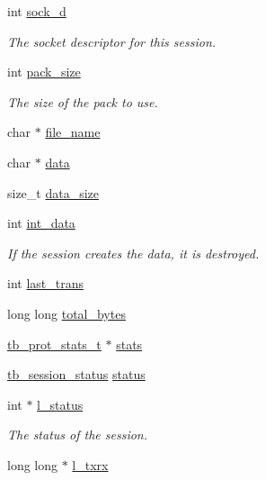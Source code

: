 \begin{DoxyCompactItemize}
int \hyperlink{structtb__session__t_a94d540b145f21be2f9b28a2c225ccf30}{sock\-\_\-d}
\begin{DoxyCompactList}\small\item\em The socket descriptor for this session. \end{DoxyCompactList}\item 
int \hyperlink{structtb__session__t_af7112fe07fe05134febc994e10196ce5}{pack\-\_\-size}
\begin{DoxyCompactList}\small\item\em The size of the pack to use. \end{DoxyCompactList}\item 
char $\ast$ \hyperlink{structtb__session__t_a8505c513bc640d1f69e5f76fb32b24a8}{file\-\_\-name}
\item 
char $\ast$ \hyperlink{structtb__session__t_a91a70b77df95bd8b0830b49a094c2acb}{data}
\item 
size\-\_\-t \hyperlink{structtb__session__t_ad6bc120bffc64dfc5230863a8ba96596}{data\-\_\-size}
\item 
int \hyperlink{structtb__session__t_adf89a25c6c2cefbabf86ff4e7931032e}{int\-\_\-data}
\begin{DoxyCompactList}\small\item\em If the session creates the data, it is destroyed. \end{DoxyCompactList}\item 
int \hyperlink{structtb__session__t_ad3547e4d09ba01be9e898cf841504521}{last\-\_\-trans}
\item 
long long \hyperlink{structtb__session__t_af8b7f35061eb6fd4b3cda13b50755b89}{total\-\_\-bytes}
\item 
\hyperlink{structtb__prot__stats__t}{tb\-\_\-prot\-\_\-stats\-\_\-t} $\ast$ \hyperlink{structtb__session__t_a464593aa6d4c80e0f689c501c4e81e8c}{stats}
\item 
\hyperlink{tb__session_8h_a81168c33495c6f3db310119f82934596}{tb\-\_\-session\-\_\-status} \hyperlink{structtb__session__t_a92613ed83a3cc0d2644758af475d9782}{status}
\item 
int $\ast$ \hyperlink{structtb__session__t_a22cc288b7e9b2ffe6053aeac5914cb40}{l\-\_\-status}
\begin{DoxyCompactList}\small\item\em The status of the session. \end{DoxyCompactList}\item 
long long $\ast$ \hyperlink{structtb__session__t_a98701b8da6c02c1671dd748b2251cea7}{l\-\_\-txrx}
\item 

\end{DoxyCompactItemize}

